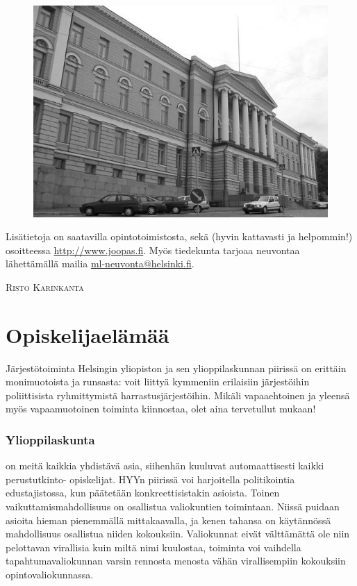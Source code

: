 \documentclass[a5paper, 8pt, twocolumn]{book} %
\numberwithin{equation}{section}
\begin{document}
\begin{figure}[!b]
	\includegraphics[width=\columnwidth]{paarakennus.png}
\end{figure}
Lisätietoja on saatavilla opintotoimistosta,
sekä (hyvin kattavasti ja helpommin!)
osoitteessa \url{http://www.joopas.fi}. Myös
tiedekunta tarjoaa neuvontaa lähettämällä
mailia \url{ml-neuvonta@helsinki.fi}.

\vspace{0.5cm}\noindent\textsc{Risto Karinkanta}

\chapter{Opiskelijaelämää}
Järjestötoiminta Helsingin yliopiston ja sen
ylioppilaskunnan piirissä on erittäin monimuotoista ja
runsasta: voit liittyä kymmeniin erilaisiin järjestöihin
poliittisista ryhmittymistä harrastusjärjestöihin. Mikäli
vapaaehtoinen ja yleensä myös vapaamuotoinen
toiminta kiinnostaa, olet aina tervetullut mukaan!

\subsection*{Ylioppilaskunta}
on meitä kaikkia yhdistävä asia, siihenhän
kuuluvat automaattisesti kaikki perustutkinto-
opiskelijat. HYYn piirissä voi
harjoitella politikointia edustajistossa, kun
päätetään konkreettisistakin asioista. Toinen
vaikuttamismahdollisuus on osallistua
valiokuntien toimintaan. Niissä puidaan
asioita hieman pienemmällä mittakaavalla,
ja kenen tahansa on käytännössä mahdollisuus
osallistua niiden kokouksiin. Valiokunnat
eivät välttämättä ole niin pelottavan
virallisia kuin miltä nimi kuulostaa, toiminta
voi vaihdella tapahtumavaliokunnan varsin
rennosta menosta vähän virallisempiin kokouksiin
opintovaliokunnassa.
\end{document}
